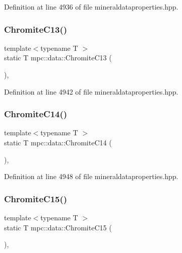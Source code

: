 Definition at line 4936 of file mineraldataproperties.\+hpp.

\mbox{\label{namespacempc_1_1data_aa52f164f28212eb152ff6b3a3924cc54}} 
\subsubsection{\texorpdfstring{Chromite\+C13()}{ChromiteC13()}}
{\footnotesize\ttfamily template$<$typename T $>$ \\
static T mpc\+::data\+::\+Chromite\+C13 (\begin{DoxyParamCaption}{ }\end{DoxyParamCaption})\hspace{0.3cm}{\ttfamily [inline]}, {\ttfamily [static]}}



Definition at line 4942 of file mineraldataproperties.\+hpp.

\mbox{\label{namespacempc_1_1data_aa6b3852313715c507d641e45dab23136}} 
\subsubsection{\texorpdfstring{Chromite\+C14()}{ChromiteC14()}}
{\footnotesize\ttfamily template$<$typename T $>$ \\
static T mpc\+::data\+::\+Chromite\+C14 (\begin{DoxyParamCaption}{ }\end{DoxyParamCaption})\hspace{0.3cm}{\ttfamily [inline]}, {\ttfamily [static]}}



Definition at line 4948 of file mineraldataproperties.\+hpp.

\mbox{\label{namespacempc_1_1data_a2731ef451f98fdc6121765dab7d7c020}} 
\subsubsection{\texorpdfstring{Chromite\+C15()}{ChromiteC15()}}
{\footnotesize\ttfamily template$<$typename T $>$ \\
static T mpc\+::data\+::\+Chromite\+C15 (\begin{DoxyParamCaption}{ }\end{DoxyParamCaption})\hspace{0.3cm}{\ttfamily [inline]}, {\ttfamily [static]}}



